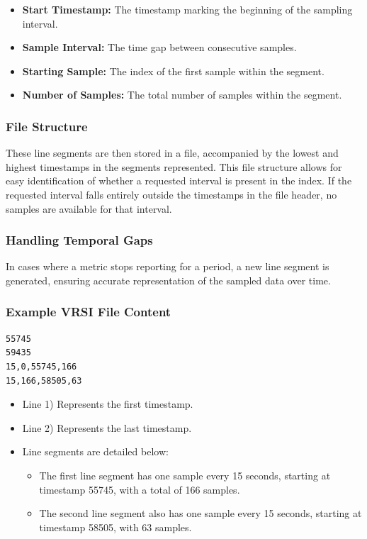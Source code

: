 \documentclass[conference]{IEEEtran}
\begin{document}
\begin{itemize}
    \item \textbf{Start Timestamp:} The timestamp marking the beginning of the sampling interval.
    \item \textbf{Sample Interval:} The time gap between consecutive samples.
    \item \textbf{Starting Sample:} The index of the first sample within the segment.
    \item \textbf{Number of Samples:} The total number of samples within the segment.
\end{itemize}
\vspace{5pt}
\subsubsection{File Structure}

These line segments are then stored in a file, accompanied by the lowest and highest timestamps in the segments represented. This file structure allows for easy identification of whether a requested interval is present in the index. If the requested interval falls entirely outside the timestamps in the file header, no samples are available for that interval.
\vspace{5pt}
\subsubsection{Handling Temporal Gaps}

In cases where a metric stops reporting for a period, a new line segment is generated, ensuring accurate representation of the sampled data over time.
\vspace{5pt}
\subsubsection{Example VRSI File Content}

\begin{verbatim}
55745
59435
15,0,55745,166
15,166,58505,63
\end{verbatim}


\begin{itemize}
    \item Line 1) Represents the first timestamp.
    \item Line 2) Represents the last timestamp.
    \item Line segments are detailed below:
    \begin{itemize}
        \item The first line segment has one sample every 15 seconds, starting at timestamp 55745, with a total of 166 samples.
        \item The second line segment also has one sample every 15 seconds, starting at timestamp 58505, with 63 samples.
    \end{itemize}
\end{itemize}
\vspace{5pt}
\end{document}
